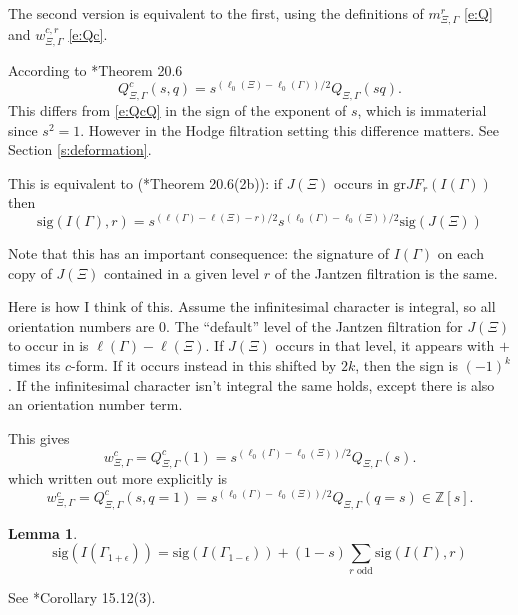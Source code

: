 \documentclass[12pt,leqno]{article}
\newtheorem{lemma}[equation]{Lemma}
\newcommand{\sig}{\text{sig}}
\newcommand{\grjf}{\text{gr}JF}
\newcommand{\Z}{\mathbb Z}
\begin{document}
The second version is equivalent to the first, using the definitions
of $m^r_{\Xi,\Gamma}$ \eqref{e:Q} and $w^{c,r}_{\Xi,\Gamma}$  \eqref{e:Qc}.


\begin{remarkplain}
According to \cite{unitaryDual}*{Theorem 20.6}
$$
Q^c_{\Xi,\Gamma}(s,q)=s^{(\ell_0(\Xi)-\ell_0(\Gamma))/2}Q_{\Xi,\Gamma}(sq).
$$
This differs from \eqref{e:QcQ} in the sign of the exponent of $s$, which is immaterial since $s^2=1$.
However in the Hodge filtration setting this difference matters. See Section \ref{s:deformation}.
\end{remarkplain}







This is equivalent to (\cite{unitaryDual}*{Theorem 20.6(2b)}): if $J(\Xi)$ occurs in
$\grjf_r(I(\Gamma))$ then
$$
\sig(I(\Gamma),r)=s^{(\ell(\Gamma)-\ell(\Xi)-r)/2}s^{(\ell_0(\Gamma)-\ell_0(\Xi))/2}\sig(J(\Xi))
$$



Note that this has an important consequence: the signature of
$I(\Gamma)$ on each copy of $J(\Xi)$ contained in a given level $r$ of
the Jantzen filtration is the same.

\begin{remarkplain}
\label{r:QcQ}
Here is how I think of this. Assume the infinitesimal character is
integral, so all orientation numbers are $0$.  The ``default'' level
of the Jantzen filtration for $J(\Xi)$ to occur in is
$\ell(\Gamma)-\ell(\Xi)$. If $J(\Xi)$ occurs in that level, it appears
with $+$ times its $c$-form. If it occurs instead in this shifted by $2k$,
then the sign is $(-1)^k$. If the infinitesimal character isn't
integral the same holds, except there is also an orientation number
term.
\end{remarkplain}

This gives
\begin{equation}
\label{e:Q1s}
w^c_{\Xi,\Gamma}=Q^c_{\Xi,\Gamma}(1)=s^{(\ell_0(\Gamma)-\ell_0(\Xi))/2}Q_{\Xi,\Gamma}(s).
\end{equation}
which written out more explicitly is
$$
w^c_{\Xi,\Gamma}=Q^c_{\Xi,\Gamma}(s,q=1)=s^{(\ell_0(\Gamma)-\ell_0(\Xi))/2}Q_{\Xi,\Gamma}(q=s)\in\Z[s].
$$





\begin{lemma}
\label{l:epsilon}
\normalfont
$$
\sig(I(\Gamma_{1+\epsilon}))=\sig(I(\Gamma_{1-\epsilon}))+(1-s)
\sum_{r\text{ odd}}\sig(I(\Gamma),r)
$$
\end{lemma}
See \cite{unitaryDual}*{Corollary 15.12(3)}.
\end{document}
